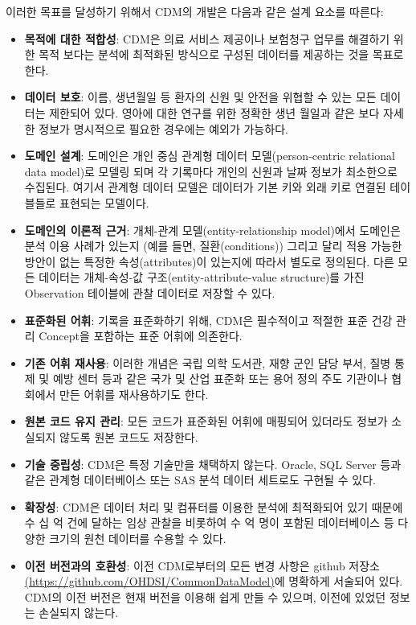 \documentclass[11pt]{book}
\providecommand{\tightlist}{%
  \setlength{\itemsep}{0pt}\setlength{\parskip}{0pt}}
\theoremstyle{definition}
\theoremstyle{definition}
\theoremstyle{definition}
\theoremstyle{remark}
\begin{document}
이러한 목표를 달성하기 위해서 CDM의 개발은 다음과 같은 설계 요소를
따른다:

\begin{itemize}
\tightlist
\item
  \textbf{목적에 대한 적합성}: CDM은 의료 서비스 제공이나 보험청구
  업무를 해결하기 위한 목적 보다는 분석에 최적화된 방식으로 구성된
  데이터를 제공하는 것을 목표로 한다.
\item
  \textbf{데이터 보호}: 이름, 생년월일 등 환자의 신원 및 안전을 위협할
  수 있는 모든 데이터는 제한되어 있다. 영아에 대한 연구를 위한 정확한
  생년 월일과 같은 보다 자세한 정보가 명시적으로 필요한 경우에는 예외가
  가능하다.
\item
  \textbf{도메인 설계}: 도메인은 개인 중심 관계형 데이터
  모델(person-centric relational data model)로 모델링 되며 각 기록마다
  개인의 신원과 날짜 정보가 최소한으로 수집된다. 여기서 관계형 데이터
  모델은 데이터가 기본 키와 외래 키로 연결된 테이블들로 표현되는
  모델이다.
\item
  \textbf{도메인의 이론적 근거}: 개체-관계 모델(entity-relationship
  model)에서 도메인은 분석 이용 사례가 있는지 (예를 들면,
  질환(conditions)) 그리고 달리 적용 가능한 방안이 없는 특정한
  속성(attributes)이 있는지에 따라서 별도로 정의된다. 다른 모든 데이터는
  개체-속성-값 구조(entity-attribute-value structure)를 가진 Observation
  테이블에 관찰 데이터로 저장할 수 있다.
\item
  \textbf{표준화된 어휘}: 기록을 표준화하기 위해, CDM은 필수적이고
  적절한 표준 건강 관리 Concept을 포함하는 표준 어휘에 의존한다.
\item
  \textbf{기존 어휘 재사용}: 이러한 개념은 국립 의학 도서관, 재향 군인
  담당 부서, 질병 통제 및 예방 센터 등과 같은 국가 및 산업 표준화 또는
  용어 정의 주도 기관이나 협회에서 만든 어휘를 재사용하기도 한다.
\item
  \textbf{원본 코드 유지 관리}: 모든 코드가 표준화된 어휘에 매핑되어
  있더라도 정보가 소실되지 않도록 원본 코드도 저장한다.
\item
  \textbf{기술 중립성}: CDM은 특정 기술만을 채택하지 않는다. Oracle, SQL
  Server 등과 같은 관계형 데이터베이스 또는 SAS 분석 데이터 세트로도
  구현될 수 있다. 
\item
  \textbf{확장성}: CDM은 데이터 처리 및 컴퓨터를 이용한 분석에
  최적화되어 있기 때문에 수 십 억 건에 달하는 임상 관찰을 비롯하여 수 억
  명이 포함된 데이터베이스 등 다양한 크기의 원천 데이터를 수용할 수
  있다. 
\item
  \textbf{이전 버전과의 호환성}: 이전 CDM로부터의 모든 변경 사항은
  github 저장소
  \href{https://github.com/OHDSI/CommonDataModel}{(https://github.com/OHDSI/CommonDataModel)}에
  명확하게 서술되어 있다. CDM의 이전 버전은 현재 버전을 이용해 쉽게 만들
  수 있으며, 이전에 있었던 정보는 손실되지 않는다.
\end{itemize}
\end{document}
